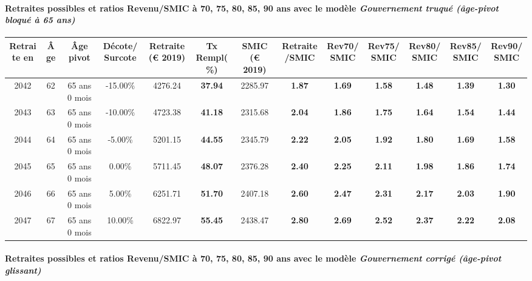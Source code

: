 \paragraph{Retraites possibles et ratios Revenu/SMIC à 70, 75, 80, 85, 90 ans avec le modèle \emph{Gouvernement truqué (âge-pivot bloqué à 65 ans)}}  
 
{ \scriptsize \begin{center} 
\begin{tabular}[htb]{|c|c||c|c||c|c||c||c|c|c|c|c|c|} 
\hline 
 Retraite en &  Âge &  Âge pivot &  Décote/Surcote &  Retraite (\euro{} 2019) &  Tx Rempl(\%) &  SMIC (\euro{} 2019) &  Retraite/SMIC &  Rev70/SMIC &  Rev75/SMIC &  Rev80/SMIC &  Rev85/SMIC &  Rev90/SMIC \\ 
\hline \hline 
 2042 &  62 &  65 ans 0 mois &  -15.00\% &  4276.24 &  {\bf 37.94} &  2285.97 &  {\bf 1.87} &  {\bf 1.69} &  {\bf 1.58} &  {\bf 1.48} &  {\bf 1.39} &  {\bf 1.30} \\ 
\hline 
 2043 &  63 &  65 ans 0 mois &  -10.00\% &  4723.38 &  {\bf 41.18} &  2315.68 &  {\bf 2.04} &  {\bf 1.86} &  {\bf 1.75} &  {\bf 1.64} &  {\bf 1.54} &  {\bf 1.44} \\ 
\hline 
 2044 &  64 &  65 ans 0 mois &  -5.00\% &  5201.15 &  {\bf 44.55} &  2345.79 &  {\bf 2.22} &  {\bf 2.05} &  {\bf 1.92} &  {\bf 1.80} &  {\bf 1.69} &  {\bf 1.58} \\ 
\hline 
 2045 &  65 &  65 ans 0 mois &  0.00\% &  5711.45 &  {\bf 48.07} &  2376.28 &  {\bf 2.40} &  {\bf 2.25} &  {\bf 2.11} &  {\bf 1.98} &  {\bf 1.86} &  {\bf 1.74} \\ 
\hline 
 2046 &  66 &  65 ans 0 mois &  5.00\% &  6251.71 &  {\bf 51.70} &  2407.18 &  {\bf 2.60} &  {\bf 2.47} &  {\bf 2.31} &  {\bf 2.17} &  {\bf 2.03} &  {\bf 1.90} \\ 
\hline 
 2047 &  67 &  65 ans 0 mois &  10.00\% &  6822.97 &  {\bf 55.45} &  2438.47 &  {\bf 2.80} &  {\bf 2.69} &  {\bf 2.52} &  {\bf 2.37} &  {\bf 2.22} &  {\bf 2.08} \\ 
\hline 
\hline 
\end{tabular} 
\end{center} } 
\paragraph{Retraites possibles et ratios Revenu/SMIC à 70, 75, 80, 85, 90 ans avec le modèle \emph{Gouvernement corrigé (âge-pivot glissant)}}  
 
